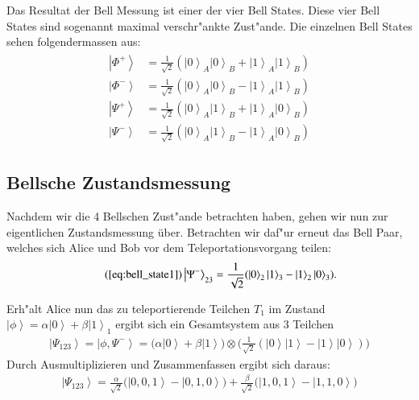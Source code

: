 \begin{refsection}
Das Resultat der Bell Messung ist einer der vier Bell States. Diese vier Bell States sind sogenannt maximal verschr"ankte Zust"ande. Die einzelnen Bell States sehen folgendermassen aus:
\begin{align}
	\begin{split}
\left|\Phi^+\right\rangle & = \frac{1}{\sqrt{2}}(\left|0\right\rangle_{A}\left|0\right\rangle_{B} + \left|1\right\rangle_{A}\left|1\right\rangle_{B}) \\
\left|\Phi^-\right\rangle & = \frac{1}{\sqrt{2}}(\left|0\right\rangle_{A}\left|0\right\rangle_{B} - \left|1\right\rangle_{A}\left|1\right\rangle_{B}) \\
\left|\Psi^+\right\rangle & = \frac{1}{\sqrt{2}}(\left|0\right\rangle_{A}\left|1\right\rangle_{B} + \left|1\right\rangle_{A}\left|0\right\rangle_{B}) \\
\left|\Psi^-\right\rangle & = \frac{1}{\sqrt{2}}(\left|0\right\rangle_{A}\left|1\right\rangle_{B} - \left|1\right\rangle_{A}\left|0\right\rangle_{B}) 
	\end{split}
\end{align}

\subsection{Bellsche Zustandsmessung}\label{sec:bell-measurement}

Nachdem wir die 4 Bellschen Zust"ande betrachten haben, gehen wir nun zur eigentlichen Zustandsmessung über. Betrachten wir daf"ur erneut das Bell Paar, welches sich Alice und Bob vor dem Teleportationsvorgang teilen:
\begin{align}  \tag{\ref{eq:bell_state1}}
 \left|\Psi^{-}\right\rangle_{23} = \frac{1}{\sqrt{2}} ( \left|0\right\rangle_{2}\left|1\right\rangle_{3} - \left|1\right\rangle_{2}\left|0\right\rangle_{3} ).
\end{align}

Erh"alt Alice nun das zu teleportierende Teilchen $T_{1}$ im Zustand $\left|\phi\right\rangle = \alpha\left|0\right\rangle + \beta\left|1\right\rangle_{1}$ ergibt sich ein Gesamtsystem aus 3 Teilchen
\begin{align}\label{eq:full_system1}
\left|\Psi_{123}\right\rangle = \left| \phi, \Psi^{-} \right\rangle = \big( \alpha \left| 0 \right\rangle + \beta \left| 1 \right\rangle \big) \otimes \big( \frac{1}{\sqrt{2}} ( \left|0\right\rangle \left|1\right\rangle - \left|1\right\rangle \left|0\right\rangle ) \big)
\end{align}
Durch Ausmultiplizieren und Zusammenfassen ergibt sich daraus:
\begin{align}\label{eq:full_system2}
\left|\Psi_{123}\right\rangle = \frac{\alpha}{\sqrt{2}} \big(\left|0, 0, 1 \right\rangle - \left|0, 1, 0 \right\rangle  \big) + \frac{\beta}{\sqrt{2}} \big(\left|1, 0, 1 \right\rangle - \left|1, 1, 0 \right\rangle \big)
\end{align}


\end{refsection}
